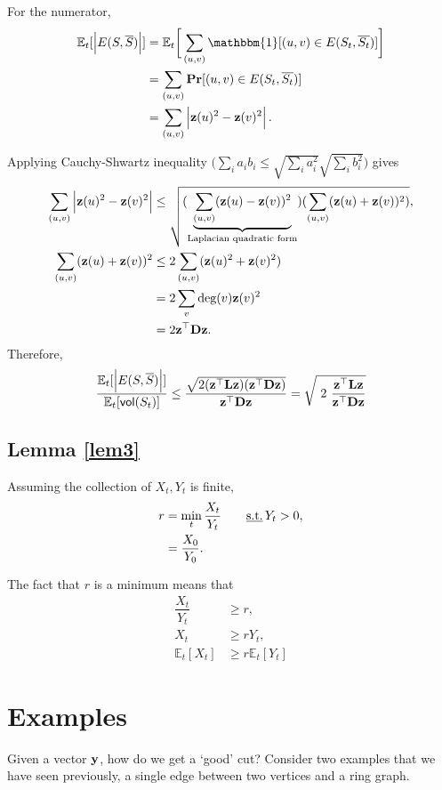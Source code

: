 \documentclass[11pt]{article}
\begin{document}
For the numerator,
\begin{align*}
\mathbb{E}_t[\abs{E(S,\overline{S})}] &= \mathbb{E}_t\bigg[\sum_{(u,v)}\mathbbm{1}[(u,v)\in E(S_t,\overline{S_t})]\bigg] \\
&= \sum_{(u,v)}\pr[(u,v) \in E(S_t,\overline{S_t})] \\
&= \sum_{(u,v)}\abs{\V{z}(u)^2-\V{z}(v)^2}.
\end{align*}

Applying Cauchy-Shwartz inequality $\bigg( \sum_ia_ib_i \leq \sqrt{\sum_ia_i^2} \sqrt{\sum_ib_i^2} \bigg)$ gives
\begin{align*}
\sum_{(u,v)}\abs{\V{z}(u)^2-\V{z}(v)^2} &\leq \sqrt{(\underbrace{\sum_{(u,v)}(\V{z}(u)-\V{z}(v))^2}_{\footnotesize \text{Laplacian quadratic form}})(\sum_{(u,v)}(\V{z}(u)+\V{z}(v))^2)}, \\
\sum_{(u,v)}(\V{z}(u)+\V{z}(v))^2 &\leq 2\sum_{(u,v)}(\V{z}(u)^2+\V{z}(v)^2) \\
&= 2\sum_v\text{deg}(v)\V{z}(v)^2 \\
&= 2\V{z}^{\top}\V{D}\V{z}.
\end{align*}
Therefore,
\begin{equation*}
\dfrac{\mathbb{E}_t[\abs{E(S,\overline{S})}]}{\mathbb{E}_t[\vol(S_t)]} \leq \dfrac{\sqrt{2(\V{z}^{\top}\V{L}\V{z})(\V{z}^{\top}\V{D}\V{z})}}{\V{z}^{\top}\V{D}\V{z}} = \sqrt{\ 2\ \dfrac{\V{z}^{\top}\V{L}\V{z}}{\V{z}^{\top}\V{D}\V{z}}}
\end{equation*}

\subsection{Lemma \ref{lem3}} \label{sec.lem3}
Assuming the collection of $X_t, Y_t$ is finite,
\begin{align*}
r &= \min_t \dfrac{X_t}{Y_t} \qquad \text{\underline{s.t.}} \, Y_t>0, \\
&= \dfrac{X_0}{Y_0}.
\end{align*}

The fact that $r$ is a minimum means that
\begin{align*}
\dfrac{X_t}{Y_t} &\geq r, \\
X_t &\geq rY_t, \\
\mathbb{E}_t[X_t] &\geq r\mathbb{E}_t[Y_t]
\end{align*}

\section{Examples}
Given a vector $\V{y}$, how do we get a `good' cut? Consider two examples that we have seen previously, a single edge between two vertices and a ring graph.
\end{document}
